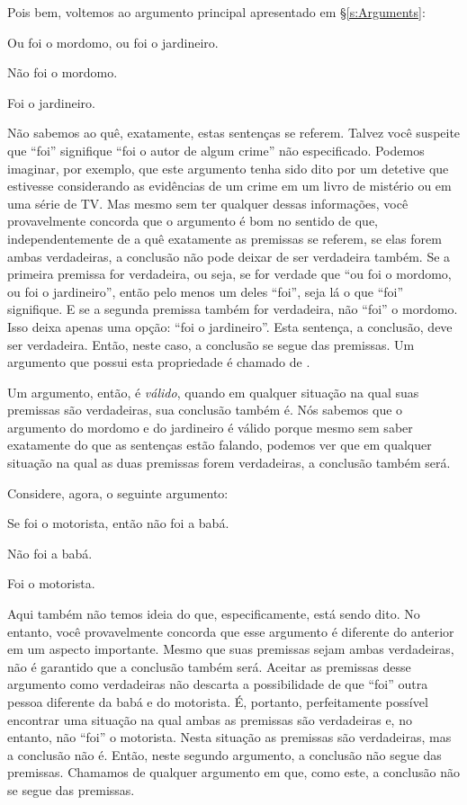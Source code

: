 Pois bem, voltemos ao argumento principal apresentado em \S\ref{s:Arguments}: 

	\begin{earg}
		\item[] Ou foi o mordomo, ou foi o jardineiro.
		\item[] Não foi o mordomo.
		\item[\therefore] Foi o jardineiro.
	\end{earg}
Não sabemos ao quê, exatamente, estas sentenças se referem.
Talvez você suspeite que ``foi'' signifique ``foi o autor de algum crime'' não especificado.
Podemos imaginar, por exemplo, que este argumento tenha sido dito por um detetive que estivesse considerando as evidências de um crime em um livro de mistério ou em uma série de TV.
Mas mesmo sem ter qualquer dessas informações, você provavelmente concorda que o argumento é bom no sentido de que, independentemente de a quê exatamente as premissas se referem, se elas forem ambas verdadeiras, a conclusão não pode deixar de ser verdadeira também.
Se a primeira premissa for verdadeira, ou seja, se for verdade que ``ou foi o mordomo, ou foi o jardineiro'', então pelo menos um deles ``foi'', seja lá o que ``foi'' signifique.
E se a segunda premissa também for verdadeira, não ``foi'' o mordomo.
Isso deixa apenas uma opção: ``foi o jardineiro''. Esta sentença, a conclusão, deve ser verdadeira.
Então, neste caso, a conclusão se segue das premissas.
Um argumento que possui esta propriedade é chamado de .

Um argumento, então, é \emph{válido}, quando em qualquer situação na qual suas premissas são verdadeiras, sua conclusão também é.
Nós sabemos que o argumento do mordomo e do jardineiro é válido porque mesmo sem saber exatamente do que as sentenças estão falando, podemos ver que em qualquer situação na qual as duas premissas forem verdadeiras, a conclusão também será.

Considere, agora, o seguinte argumento:
\begin{earg}\label{argMaidDriver}
	\item[] Se foi o motorista, então não foi a babá.
	\item[] Não foi a babá.
	\item[\therefore] Foi o motorista.
\end{earg}
Aqui também não temos ideia do que, especificamente, está sendo dito.
No entanto, você provavelmente concorda que esse argumento é diferente do anterior em um aspecto importante.
Mesmo que suas premissas sejam ambas verdadeiras, não é garantido que a conclusão também será.
Aceitar as premissas desse argumento como verdadeiras não descarta a possibilidade de que ``foi'' outra pessoa diferente da babá e do motorista.
É, portanto, perfeitamente possível encontrar uma situação na qual  ambas as premissas são verdadeiras e, no entanto, não ``foi'' o motorista.
Nesta situação as premissas são verdadeiras, mas a conclusão não é.
Então, neste segundo argumento, a conclusão não segue das premissas.
Chamamos de  qualquer argumento em que, como este, a conclusão não se segue das premissas.

